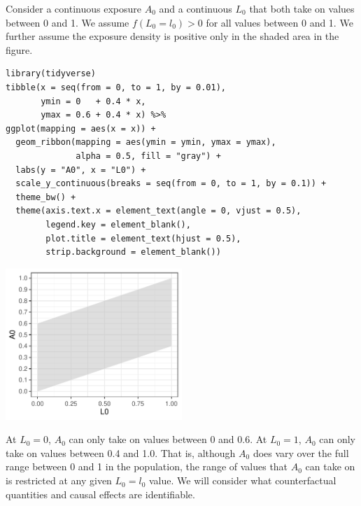 \documentclass[dvipdfmx,10pt]{article}
\begin{document}
Consider a continuous exposure \(A_{0}\) and a continuous \(L_{0}\) that both take on values between 0 and 1. We assume \(f(L_{0} = l_{0}) > 0\) for all values between 0 and 1. We further assume the exposure density is positive only in the shaded area in the figure.

\scriptsize
\begin{verbatim}
library(tidyverse)
tibble(x = seq(from = 0, to = 1, by = 0.01),
       ymin = 0   + 0.4 * x,
       ymax = 0.6 + 0.4 * x) %>% 
ggplot(mapping = aes(x = x)) +
  geom_ribbon(mapping = aes(ymin = ymin, ymax = ymax),
              alpha = 0.5, fill = "gray") +
  labs(y = "A0", x = "L0") +
  scale_y_continuous(breaks = seq(from = 0, to = 1, by = 0.1)) + 
  theme_bw() +
  theme(axis.text.x = element_text(angle = 0, vjust = 0.5),
        legend.key = element_blank(),
        plot.title = element_text(hjust = 0.5),
        strip.background = element_blank())
\end{verbatim}

\begin{center}
\includegraphics[page=1,keepaspectratio,width=0.5\textwidth,height=\textheight]{./source/positivity_figure1.pdf}
\end{center}
\normalsize

At \(L_{0} = 0\), \(A_{0}\) can only take on values between 0 and 0.6. At \(L_{0} = 1\), \(A_{0}\) can only take on values between 0.4 and 1.0. That is, although \(A_{0}\) does vary over the full range between 0 and 1 in the population, the range of values that \(A_{0}\) can take on is restricted at any given \(L_{0}=l_{0}\) value. We will consider what counterfactual quantities and causal effects are identifiable.\\
\end{document}
